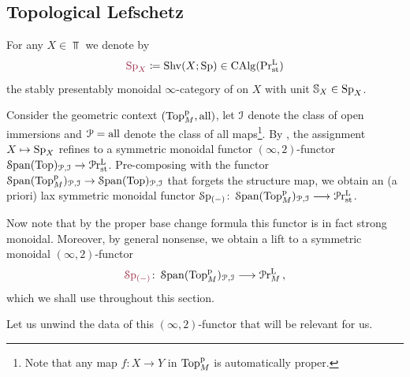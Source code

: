 \subsection{Topological Lefschetz}\label{subsec: topological lefschetz}

\begin{defn}
For any $X \in \Top$ we denote by
\[\mdef{\pSp{X}}\coloneq \Shv(X;\Sp) \in \CAlg(\Prlst)\]
the stably presentably monoidal $\infty$-category of  on $X$ with unit $\SS_{X}\in \pSp{X}$.
\end{defn}

\begin{cons}
Consider the geometric context $(\mathrm{Top}^{\mathrm{p}}_{M},\mathrm{all})$, let
$\mathcal{I}$ denote the class of open immersions and $\mathcal{P}=\mathrm{all}$ denote the class of all maps\footnote{Note that any map $f\colon X\to Y$ in $\mathrm{Top}^{\mathrm{p}}_{M}$ is automatically proper.}.
By , the assignment 
$X\mapsto \pSp{X}$ refines to a symmetric monoidal functor $(\infty,2)$-functor $\operatorname{\mathcal S\mathrm{pan}}({\mathrm{Top}})_{\mathcal{P},\mathcal{I}}\to \mathcal{P}\mathrm{r}^{\mathrm{L}}_{\mathrm{st}}$. Pre-composing
with the functor $\operatorname{\mathcal S\mathrm{pan}}({\mathrm{Top}^{\mathrm{p}}_{M}})_{\mathcal{P},\mathcal{I}} \to \operatorname{\mathcal S\mathrm{pan}}({\mathrm{Top}})_{\mathcal{P},\mathcal{I}}$ that forgets the structure map, we obtain an (a priori) 
lax symmetric monoidal functor $\pSpf{(-)}\colon \sSpan{\pTop{\base}}_{\cP,\cI}\too \Prlstf$.

Now note that by the proper base change formula  this functor
is in fact strong monoidal. Moreover, by general nonsense, we obtain
a lift to a symmetric monoidal $(\infty,2)$-functor 
\[ \mdef{\pSpf{(-)}}\colon \sSpan{\pTop{\base}}_{\cP,\cI}\too \pPrlf{\base}\,,\]
which we shall use throughout this section.
\end{cons}

Let us unwind the data of this $(\infty,2)$-functor that will
be relevant for us.


